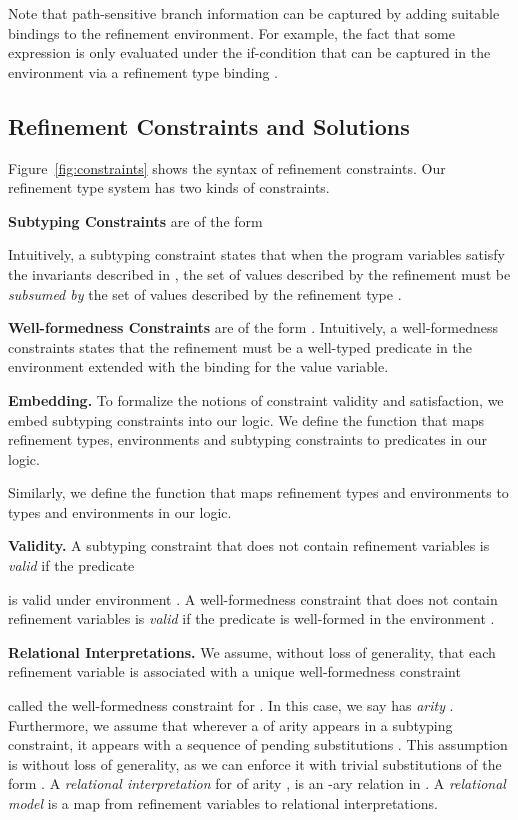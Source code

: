 \documentclass[nocopyrightspace]{sigplanconf}
\def\mypara#1{\smallskip\noindent\textbf{#1}}
\begin{document}
Note that path-sensitive branch information can be captured by adding 
suitable bindings to the refinement environment. 
For example, the fact that some expression is only evaluated under 
the if-condition that  can be captured in the
environment via a refinement type binding 
.

\subsection{Refinement Constraints and Solutions}
\label{sec:refconstr}

Figure~\ref{fig:constraints} shows the syntax of refinement constraints.
Our refinement type system has two kinds of constraints. 


\mypara{Subtyping Constraints} are of the form

Intuitively, a subtyping constraint states that when the program variables satisfy
the invariants described in , the set of values described by
the refinement  must be \emph{subsumed by} 
the set of values described by the refinement type .

\mypara{Well-formedness Constraints} are of the form 
. 
Intuitively, a well-formedness constraints states that the refinement 
must be a well-typed predicate in the environment  extended with the
binding  for the value variable.


\mypara{Embedding.}
To formalize the notions of constraint validity and satisfaction, we embed subtyping
constraints into our logic. We define the function  that maps
refinement types, environments and subtyping constraints to predicates in
our logic.

Similarly, we define the function  that maps refinement
types and environments to types and environments in our logic.




\mypara{Validity.}
A subtyping constraint  
that does not contain refinement variables
is \emph{valid} if the predicate 
 
is valid under environment .
A well-formedness constraint  
that does not contain refinement variables
is \emph{valid} if the predicate  is well-formed 
in the environment .

\mypara{Relational Interpretations.}
We assume, without loss of generality, that each refinement variable  
is associated with a unique well-formedness constraint
 
called the well-formedness constraint for .
In this case, we say  has \emph{arity} .
Furthermore, we assume that wherever a  of arity  appears in 
a subtyping constraint, it appears with a sequence of  pending
substitutions .
This assumption is without loss of generality, as we can enforce it
with trivial substitutions of the form .
A \emph{relational interpretation} for  of arity , is 
an -ary relation in .
A \emph{relational model} is a map from refinement variables 
 to relational interpretations.
\end{document}
